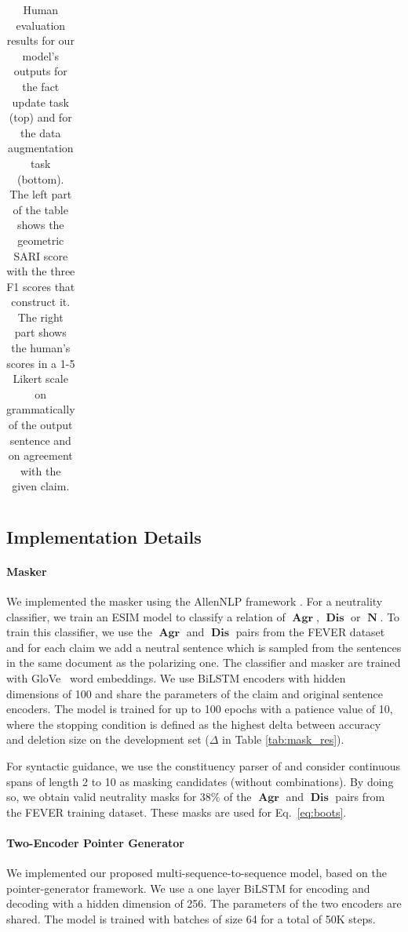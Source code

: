 \documentclass[letterpaper]{article} %
\newcommand{\tabref}[1]{Table \ref{#1}}
\renewcommand{\eqref}[1]{Eq.~\ref{#1}}
\DeclareMathOperator{\A}{\boldsymbol{Agr}}
\DeclareMathOperator{\D}{\boldsymbol{Dis}}
\DeclareMathOperator{\N}{\boldsymbol{N}}
\begin{document}
\begin{table}[t]
\begin{tabular}{llrrrrccc}
\bottomrule
\end{tabular}
\caption{Human evaluation results for our model's outputs for the fact update task (top) and for the data augmentation task (bottom). 
The left part of the table shows the geometric SARI score with the three \textsc{F1} scores that construct it. 
The right part shows the human's scores in a 1-5 Likert scale on grammatically of the output sentence and on agreement with the given claim.}\label{tab:symmetric_auto_res}

\end{table}


\subsection{Implementation Details}

\paragraph{Masker}
We implemented the masker using the AllenNLP framework \cite{Gardner2017AllenNLP}. For a neutrality classifier, we train an ESIM model \cite{chen2017enhanced} to classify a relation of $\A$, $\D$ or $\N$. To train this classifier, we use the $\A$ and $\D$ pairs from the FEVER dataset and for each claim we add a neutral sentence which is sampled from the sentences in the same document as the polarizing one. The classifier and masker are trained with GloVe~\cite{pennington-etal-2014-glove} word embeddings. We use BiLSTM \cite{sak2014long} encoders with hidden dimensions of 100 and share the parameters of the claim and original sentence encoders. The model is trained for up to 100 epochs with a patience value of 10, where the stopping condition is defined as the highest delta between accuracy and deletion size on the development set ($\Delta$ in \tabref{tab:mask_res}).%

For syntactic guidance, we use the constituency parser of \cite{stern-etal-2017-minimal} and consider continuous spans of length 2 to 10 as masking candidates (without combinations). By doing so, we obtain valid neutrality masks for 38\% of the $\A$ and $\D$ pairs from the FEVER training dataset. These masks are used for \eqref{eq:boots}.

\paragraph{Two-Encoder Pointer Generator}
We implemented our proposed multi-sequence-to-sequence model, based on the pointer-generator framework.%
We use a one layer BiLSTM for encoding and decoding with a hidden dimension of 256. The parameters of the two encoders are shared. The model is trained with batches of size 64 for a total of 50K steps.%
\end{document}
